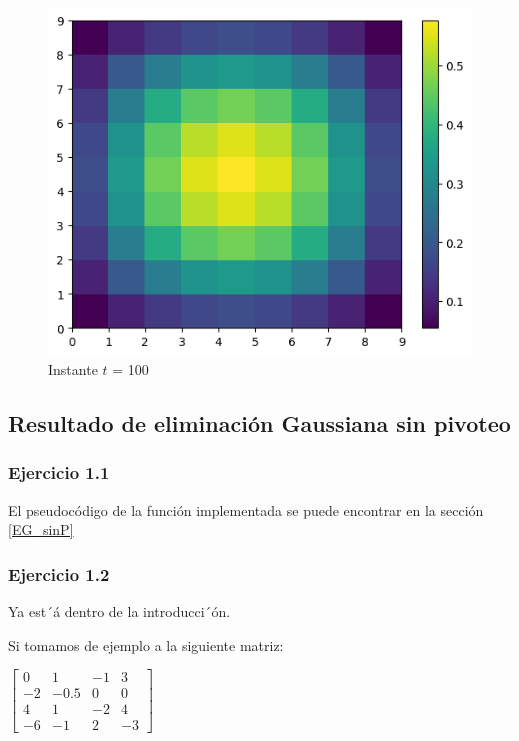 \begin{figure}[H]
\begin{minipage}[b]{0.5\linewidth}
  \end{minipage}%
  \begin{minipage}[b]{0.5\linewidth}
    \centering
    \includegraphics[width=.5\linewidth]{./img/instante100.png}
  \caption{Instante $t$ = 100}\label{instante100}
    \vspace{4ex}
  \end{minipage} 
\end{figure}






\iffalse
    \subsection{Resultado de eliminación Gaussiana sin pivoteo}
    \label{resultados EG}

    \subsubsection{Ejercicio 1.1}
    El pseudocódigo de la función implementada se puede encontrar en la sección \ref{EG_sinP}

    \subsubsection{Ejercicio 1.2}

    Ya est´á dentro de la introducci´ón.



    Si tomamos de ejemplo a la siguiente matriz:

    \begin{center}
    $\begin{bmatrix}
    0 & 1 & -1 & 3\\
    -2 & -0.5 & 0 & 0\\
    4 & 1 & -2 & 4\\
    -6 & -1 & 2 & -3
    \end{bmatrix}$
    \end{center}
                  
